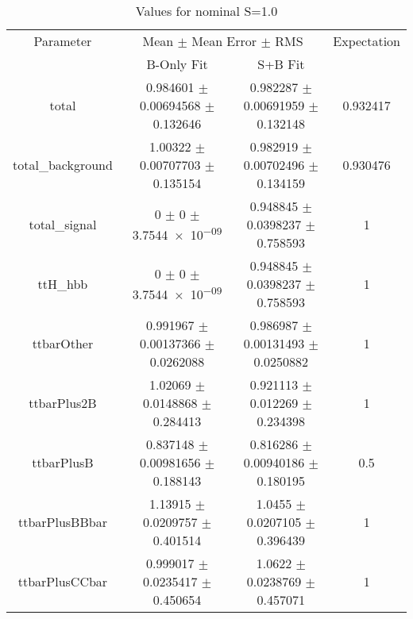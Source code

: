 \begin{table}
\centering
\caption{Values for nominal S=1.0}
\begin{tabular}{cccc}
\toprule
Parameter & \multicolumn{2}{c}{Mean $\pm$ Mean Error $\pm$ RMS} & Expectation\\
 & B-Only Fit & S+B Fit & \\
\midrule
total & \num{0.984601} $\pm$ \num{0.00694568} $\pm$ \num{0.132646} & \num{0.982287} $\pm$ \num{0.00691959} $\pm$ \num{0.132148} & \num{0.932417}\\
total\_background & \num{1.00322} $\pm$ \num{0.00707703} $\pm$ \num{0.135154} & \num{0.982919} $\pm$ \num{0.00702496} $\pm$ \num{0.134159} & \num{0.930476}\\
total\_signal & \num{0} $\pm$ \num{0} $\pm$ \num{3.7544e-09} & \num{0.948845} $\pm$ \num{0.0398237} $\pm$ \num{0.758593} & \num{1}\\
ttH\_hbb & \num{0} $\pm$ \num{0} $\pm$ \num{3.7544e-09} & \num{0.948845} $\pm$ \num{0.0398237} $\pm$ \num{0.758593} & \num{1}\\
ttbarOther & \num{0.991967} $\pm$ \num{0.00137366} $\pm$ \num{0.0262088} & \num{0.986987} $\pm$ \num{0.00131493} $\pm$ \num{0.0250882} & \num{1}\\
ttbarPlus2B & \num{1.02069} $\pm$ \num{0.0148868} $\pm$ \num{0.284413} & \num{0.921113} $\pm$ \num{0.012269} $\pm$ \num{0.234398} & \num{1}\\
ttbarPlusB & \num{0.837148} $\pm$ \num{0.00981656} $\pm$ \num{0.188143} & \num{0.816286} $\pm$ \num{0.00940186} $\pm$ \num{0.180195} & \num{0.5}\\
ttbarPlusBBbar & \num{1.13915} $\pm$ \num{0.0209757} $\pm$ \num{0.401514} & \num{1.0455} $\pm$ \num{0.0207105} $\pm$ \num{0.396439} & \num{1}\\
ttbarPlusCCbar & \num{0.999017} $\pm$ \num{0.0235417} $\pm$ \num{0.450654} & \num{1.0622} $\pm$ \num{0.0238769} $\pm$ \num{0.457071} & \num{1}\\
\bottomrule
\end{tabular}
\end{table}